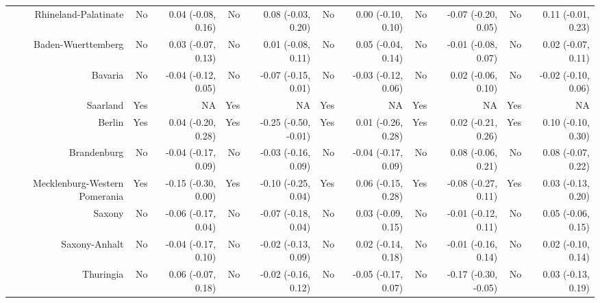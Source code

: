 \documentclass[
  man,floatsintext]{apa6}
\newenvironment{lltable}{\begin{landscape}\centering\begin{ThreePartTable}}{\end{ThreePartTable}\end{landscape}}
\begin{document}
\begin{lltable}
{\begin{longtable}{rrrrrrrrrrr}
Rhineland-Palatinate & No & 0.04 (-0.08, 0.16) & No & 0.08 (-0.03, 0.20) & No & 0.00 (-0.10, 0.10) & No & -0.07 (-0.20, 0.05) & No & 0.11 (-0.01, 0.23)\\
Baden-Wuerttemberg & No & 0.03 (-0.07, 0.13) & No & 0.01 (-0.08, 0.11) & No & 0.05 (-0.04, 0.14) & No & -0.01 (-0.08, 0.07) & No & 0.02 (-0.07, 0.11)\\
Bavaria & No & -0.04 (-0.12, 0.05) & No & -0.07 (-0.15, 0.01) & No & -0.03 (-0.12, 0.06) & No & 0.02 (-0.06, 0.10) & No & -0.02 (-0.10, 0.06)\\
Saarland & Yes & NA & Yes & NA & Yes & NA & Yes & NA & Yes & NA\\
Berlin & Yes & 0.04 (-0.20, 0.28) & Yes & -0.25 (-0.50, -0.01) & Yes & 0.01 (-0.26, 0.28) & Yes & 0.02 (-0.21, 0.26) & Yes & 0.10 (-0.10, 0.30)\\
Brandenburg & No & -0.04 (-0.17, 0.09) & No & -0.03 (-0.16, 0.09) & No & -0.04 (-0.17, 0.09) & No & 0.08 (-0.06, 0.21) & No & 0.08 (-0.07, 0.22)\\
Mecklenburg-Western Pomerania & Yes & -0.15 (-0.30, 0.00) & Yes & -0.10 (-0.25, 0.04) & Yes & 0.06 (-0.15, 0.28) & Yes & -0.08 (-0.27, 0.11) & Yes & 0.03 (-0.13, 0.20)\\
Saxony & No & -0.06 (-0.17, 0.04) & No & -0.07 (-0.18, 0.04) & No & 0.03 (-0.09, 0.15) & No & -0.01 (-0.12, 0.11) & No & 0.05 (-0.06, 0.15)\\
Saxony-Anhalt & No & -0.04 (-0.17, 0.10) & No & -0.02 (-0.13, 0.09) & No & 0.02 (-0.14, 0.18) & No & -0.01 (-0.16, 0.14) & No & 0.02 (-0.10, 0.14)\\
Thuringia & No & 0.06 (-0.07, 0.18) & No & -0.02 (-0.16, 0.12) & No & -0.05 (-0.17, 0.07) & No & -0.17 (-0.30, -0.05) & No & 0.03 (-0.13, 0.19)\\
\bottomrule
\end{longtable}

}

\end{lltable}
\end{document}

